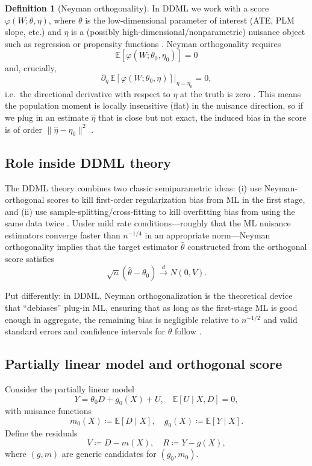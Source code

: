 \documentclass [11pt]{article}
\theoremstyle{plain}
\theoremstyle{definition}
\newtheorem{definition}[theorem]{Definition}
\theoremstyle{remark}
\newcommand{\1}{\bm{1}}
\newcommand{\E}{\mathbb{E}}
\begin{document}
\begin{appendices}
\begin{definition}[Neyman orthogonality]
In DDML we work with a score $\varphi(W; \theta, \eta)$, where $\theta$ is the low-dimensional parameter of interest (ATE, PLM slope, etc.) and $\eta$ is a (possibly high-dimensional/nonparametric) nuisance object such as regression or propensity functions \citep[Section 2]{chernozhukov2018dml}. Neyman orthogonality requires
\[
\E[\varphi(W; \theta_0, \eta_0)] = 0
\]
and, crucially,
\[
\partial_\eta \,\E[\varphi(W; \theta_0, \eta)]
\big\vert_{\eta = \eta_0} = 0,
\]
i.e.\ the directional derivative with respect to $\eta$ at the truth is zero \citep[Def.~1]{doubleml2022}. This means the population moment is locally insensitive (flat) in the nuisance direction, so if we plug in an estimate $\hat{\eta}$ that is close but not exact, the induced bias in the score is of order $\|\hat{\eta} - \eta_0\|^2$ \citep[Sec.~2.1]{chernozhukov2018dml}.
\end{definition}

\subsection*{Role inside DDML theory}

The DDML theory combines two classic semiparametric ideas: (i) use Neyman-orthogonal scores to kill first-order regularization bias from ML in the first stage, and (ii) use sample-splitting/cross-fitting to kill overfitting bias from using the same data twice \citep[Sec.~2]{chernozhukov2018dml}. Under mild rate conditions---roughly that the ML nuisance estimators converge faster than $n^{-1/4}$ in an appropriate norm---Neyman orthogonality implies that the target estimator $\hat{\theta}$ constructed from the orthogonal score satisfies
\[
\sqrt{n} (\hat{\theta} - \theta_0) \stackrel{d}{\to} N(0, V).
\]

Put differently: in DDML, Neyman orthogonalization is the theoretical device that ``debiases'' plug-in ML, ensuring that as long as the first-stage ML is good enough in aggregate, the remaining bias is negligible relative to $n^{-1/2}$ and valid standard errors and confidence intervals for $\theta$ follow \citep[Sec.~2.2]{doubleml2022}.

\subsection{Partially linear model and orthogonal score}

Consider the partially linear model
\[
Y = \theta_0 D + g_0(X) + U, \quad \E[U \mid X, D] = 0,
\]
with nuisance functions
\[
m_0(X) \coloneqq \E[D \mid X], \quad g_0(X) \coloneqq \E[Y \mid X].
\]
Define the residuals
\[
V \coloneqq D - m(X), \quad R \coloneqq Y - g(X),
\]
where $(g,m)$ are generic candidates for $(g_0,m_0)$.


\end{appendices}
\end{document}
